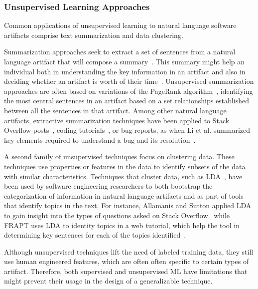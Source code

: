 \subsubsection{Unsupervised Learning Approaches}



Common applications of unsupervised learning 
to natural language software artifacts 
comprise text summarization and data clustering.


Summarization approaches seek to
extract a set of sentences 
from a natural language artifact that will compose a summary~\cite{Goldsteinet1999}.
This summary might help an individual both in understanding the key information in an 
artifact and also in deciding whether an artifact is worth of their time~\cite{Lotufo2012}.
Unsupervised summarization approaches are often based on 
variations of the PageRank algorithm~\cite{Page1999}, identifying
the most central sentences in an artifact based on a set relationships
established between all the sentences in that artifact.
Among other natural language artifacts,
extractive summarization techniques
have been applied to Stack Overflow posts~\cite{Ponzanelli2015},
coding tutorials~\cite{Li2018},
or bug reports, as
when Li et al. summarized 
key elements required to understand a bug and its resolution~\cite{li2018deep}.




A second family of unsupervised techniques focus on clustering data.
These techniques use properties or features in the data to 
identify 
subsets of the data with similar characteristics. 
Techniques that cluster data, such as \acf{LDA}~\cite{blei2003latent},
have been used by software engineering researchers to both 
bootstrap the categorization of information in 
natural language artifacts and as part of tools that identify topics in the text. 
For instance, Allamanis and Sutton
applied \acs{LDA}
to gain insight into the types of questions 
asked on Stack Overflow~\cite{Allamanis2013}
while FRAPT
uses \acs{LDA} to identity topics in a web tutorial,
which help the tool in determining 
key sentences for each of the topics identified~\cite{Jiang2017}.



Although unsupervised techniques lift the need of labeled training data,
they still use human engineered features, 
which are often often specific to certain 
types of artifact. Therefore, 
both supervised and unsupervised \acs{ML}
have limitations that might prevent their usage 
in the design of a generalizable technique.




